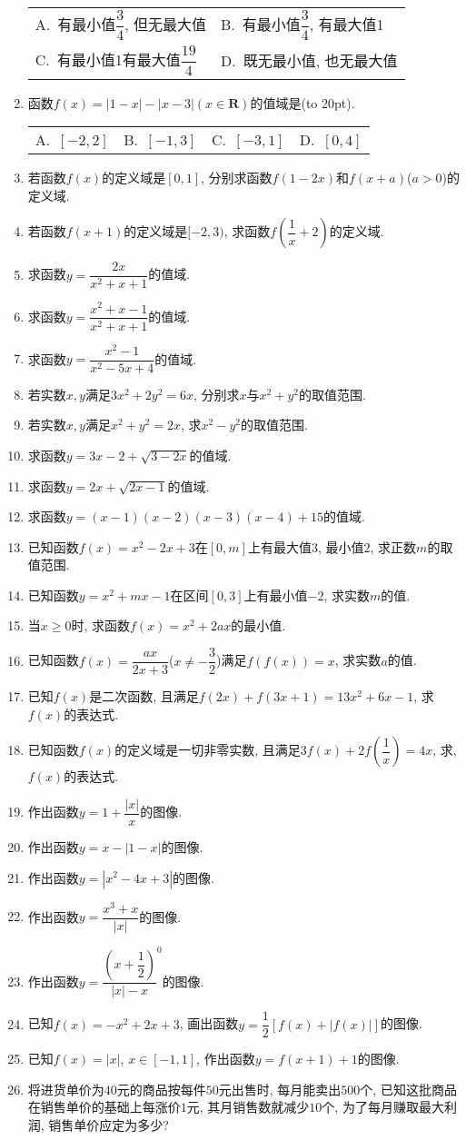 \documentclass[10pt,a4paper]{article}
\newcommand{\bracket}[1]{(\hbox to #1pt{})}
\newcommand{\twoch}[4]{\par\begin{tabular}{p{.46\textwidth}p{.46\textwidth}}
A.~#1& B.~#2\\
C.~#3& D.~#4
\end{tabular}}
\newcommand{\fourch}[4]{\par\begin{tabular}{p{.23\textwidth}p{.23\textwidth}p{.23\textwidth}p{.23\textwidth}}
A.~#1 &B.~#2& C.~#3& D.~#4
\end{tabular}}
\begin{document}
\begin{enumerate}[1.]
\twoch{有最小值$\dfrac 34$, 但无最大值}{有最小值$\dfrac 34$, 有最大值1}{有最小值1有最大值$\dfrac{19}4$}{既无最小值, 也无最大值}
\item 函数$f(x)=|1-x|-|x-3|(x\in \mathbf{R})$的值域是\bracket{20}.
\fourch{$[-2,2]$}{$[-1,3]$}{$[-3,1]$}{$[0,4]$}
\item 若函数$f(x)$的定义域是$[0,1]$, 分别求函数$f(1-2x)$和$f(x+a)$($a>0$)的定义域.
\item 若函数$f(x+1)$的定义域是$[-2,3)$, 求函数$f(\dfrac 1x+2)$的定义域.
\item 求函数$y=\dfrac{2x}{x^2+x+1}$的值域.
\item 求函数$y=\dfrac{x^2+x-1}{x^2+x+1}$的值域.
\item 求函数$y=\dfrac{x^2-1}{x^2-5x+4}$的值域.
\item 若实数$x,y$满足$3x^2+2y^2=6x$, 分别求$x$与$x^2+y^2$的取值范围.
\item 若实数$x,y$满足$x^2+y^2=2x$, 求$x^2-y^2$的取值范围.
\item 求函数$y=3x-2+\sqrt {3-2x}$的值域.
\item 求函数$y=2x+\sqrt {2x-1}$的值域.
\item 求函数$y=(x-1)(x-2)(x-3)(x-4)+15$的值域.
\item 已知函数$f(x)=x^2-2x+3$在$[0,m]$上有最大值$3$, 最小值$2$, 求正数$m$的取值范围.
\item 已知函数$y=x^2+mx-1$在区间$[0,3]$上有最小值$-2$, 求实数$m$的值.
\item 当$x\ge 0$时, 求函数$f(x)=x^2+2ax$的最小值.
\item 已知函数$f(x)=\dfrac{ax}{2x+3}$($x\ne -\dfrac 32$)满足$f(f(x))=x$, 求实数$a$的值.
\item 已知$f(x)$是二次函数, 且满足$f(2x)+f(3x+1)=13x^2+6x-1$, 求$f(x)$的表达式.
\item 已知函数$f(x)$的定义域是一切非零实数, 且满足$3f(x)+2f(\dfrac 1x)=4x$, 求, $f(x)$的表达式.
\item 作出函数$y=1+\dfrac{|x|}x$的图像.
\item 作出函数$y=x-|1-x|$的图像.
\item 作出函数$y=|x^2-4x+3|$的图像.
\item 作出函数$y=\dfrac{x^3+x}{|x|}$的图像.
\item 作出函数$y=\dfrac{(x+\dfrac 12)}{|x|-x}^0$的图像.
\item 已知$f(x)=-x^2+2x+3$, 画出函数$y=\dfrac 12[f(x)+|f(x)|]$的图像.
\item 已知$f(x)=|x|$, $x\in [-1,1]$, 作出函数$y=f(x+1)+1$的图像.
\item 将进货单价为$40$元的商品按每件$50$元出售时, 每月能卖出$500$个, 已知这批商品在销售单价的基础上每涨价$1$元, 其月销售数就减少$10$个, 为了每月赚取最大利润, 销售单价应定为多少?

\end{enumerate}
\end{document}
